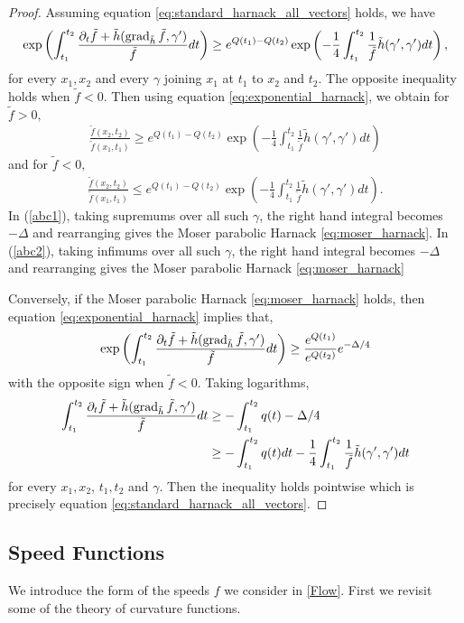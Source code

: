 \begin{proof}
Assuming equation \eqref{eq:standard_harnack_all_vectors} holds, we have
\[
\exp\left(\int_{t_1}^{t_2} \frac{\partial_t \tilde{f} + \tilde{h} (\operatorname{grad}_{\tilde{h}} \tilde{f}, \gamma')}{\tilde{f}} dt\right) \geq e^{Q(t_1) - Q(t_2)} \exp\left(- \frac{1}{4} \int_{t_1}^{t_2} \frac{1}{\tilde{f}} \tilde{h}(\gamma', \gamma') dt\right),
\]
for every $x_1, x_2$ and every $\gamma$ joining $x_1$ at $t_1$ to $x_2$ and $t_2$. The opposite inequality holds when $\tilde{f} < 0$. Then using equation \eqref{eq:exponential_harnack}, we obtain for $\tilde{f}>0,$
\begin{align}\label{abc1}
\frac{\tilde{f} (x_2, t_2)}{\tilde{f} (x_1, t_1)} \geq e^{Q(t_1) - Q(t_2)} \exp\left(- \frac{1}{4} \int_{t_1}^{t_2} \frac{1}{\tilde{f}} \tilde{h}(\gamma', \gamma') dt\right)
\end{align}
and for $\tilde{f}<0,$
\begin{align}\label{abc2}
\frac{\tilde{f} (x_2, t_2)}{\tilde{f} (x_1, t_1)} \leq e^{Q(t_1) - Q(t_2)} \exp\left(- \frac{1}{4} \int_{t_1}^{t_2} \frac{1}{\tilde{f}} \tilde{h}(\gamma', \gamma') dt\right).
\end{align}
In (\ref{abc1}), taking supremums over all such $\gamma$, the right hand integral becomes $-\Delta$ and rearranging gives the Moser parabolic Harnack \eqref{eq:moser_harnack}. In (\ref{abc2}), taking infimums over all such $\gamma$, the right hand integral becomes $-\Delta$ and rearranging gives the Moser parabolic Harnack \eqref{eq:moser_harnack}

Conversely, if the Moser parabolic Harnack \eqref{eq:moser_harnack} holds, then equation \eqref{eq:exponential_harnack} implies that,
\[
\exp \left(\int_{t_1}^{t_2} \frac{\partial_t \tilde{f} + \tilde{h} (\operatorname{grad}_{\tilde{h}} \tilde{f}, \gamma')}{\tilde{f}} dt\right) \geq \frac{e^{Q(t_1)}}{e^{Q(t_2)}} e^{-\Delta/4}
\]
with the opposite sign when $\tilde{f} < 0$. Taking logarithms,
\[
\begin{split}
\int_{t_1}^{t_2} \frac{\partial_t \tilde{f} + \tilde{h} (\operatorname{grad}_{\tilde{h}} \tilde{f}, \gamma')}{\tilde{f}} dt &\geq -\int_{t_1}^{t_2} q(t) - \Delta/4 \\
&\geq - \int_{t_1}^{t_2} q(t) dt -  \frac{1}{4} \int_{t_1}^{t_2} \frac{1}{\tilde{f}} \tilde{h}(\gamma', \gamma') dt
\end{split}
\]
for every $x_1, x_2$, $t_1, t_2$ and $\gamma$. Then the inequality holds pointwise which is precisely equation \eqref{eq:standard_harnack_all_vectors}.
\end{proof}

\subsection{Speed Functions}
\label{subsec:bg_speed}
We introduce the form of the speeds $f$ we consider in \eqref{Flow}. First we revisit some of the theory of curvature functions.


